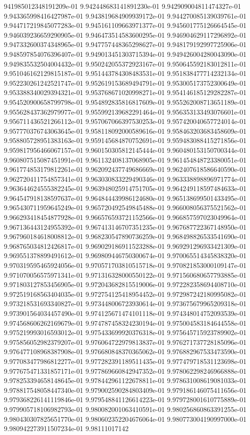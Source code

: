 941985012348191209e-01	9.942448683141891230e-01	9.942909004811474327e-01	9.943365998416427987e-01	9.943819684909939172e-01	9.944270085139039761e-01	9.944717219845077283e-01	9.945161109663971377e-01	9.945601775126664545e-01	9.946039236659290905e-01	9.946473514583600295e-01	9.946904629117296892e-01	9.947332600374348965e-01	9.947757448365298627e-01	9.948179192997725906e-01	9.948597854076396407e-01	9.949013451303715394e-01	9.949426004280043090e-01	9.949835532504004432e-01	9.950242055372923167e-01	9.950645592183012811e-01	9.951046162129815187e-01	9.951443784308483531e-01	9.951838477714232134e-01	9.952230261242521747e-01	9.952619153689494791e-01	9.953005173752300649e-01	9.953388340029394321e-01	9.953768671020998271e-01	9.954146185129282287e-01	9.954520900658799798e-01	9.954892835816817609e-01	9.955262008713651189e-01	9.955628437362979977e-01	9.955992139682291464e-01	9.956353133493076601e-01	9.956711436521266112e-01	9.957067066397530253e-01	9.957420040657724014e-01	9.957770376743063645e-01	9.958118092000589616e-01	9.958463203683458609e-01	9.958805728951383163e-01	9.959145684870752691e-01	9.959483088415271856e-01	9.959817956466067157e-01	9.960150305812145444e-01	9.960480153150700344e-01	9.960807515087451991e-01	9.961132408137068905e-01	9.961454848723380051e-01	9.961774853179812261e-01	9.962092437749686669e-01	9.962407618586640590e-01	9.962720411754857341e-01	9.963030833229490346e-01	9.963338898896971774e-01	9.963644624555382245e-01	9.963948025914751705e-01	9.964249118597484633e-01	9.964547918138597637e-01	9.964844439986124680e-01	9.965138699501433495e-01	9.965430711959645249e-01	9.965720492549845488e-01	9.966008056375521562e-01	9.966293418454877928e-01	9.966576593721152566e-01	9.966857597023049964e-01	9.967136443124955392e-01	9.967413146707351235e-01	9.967687722367148950e-01	9.967960184618008812e-01	9.968230547890736259e-01	9.968498826533541690e-01	9.968765034812426817e-01	9.969029186911523288e-01	9.969291296933421309e-01	9.969551378899491612e-01	9.969809446750300674e-01	9.970065514345838320e-01	9.970319595465924056e-01	9.970571703810515718e-01	9.970821853000109147e-01	9.971070056575971341e-01	9.971316328000550122e-01	9.971560680657793885e-01	9.971803127853456905e-01	9.972043682815519006e-01	9.972282358694408710e-01	9.972519168563404035e-01	9.972754125418954452e-01	9.972987242180995082e-01	9.973218531693340827e-01	9.973448006723930614e-01	9.973675679965209318e-01	9.973901564034457490e-01	9.974125671474101118e-01	9.974348014752093539e-01	9.974568606262169679e-01	9.974787458324230194e-01	9.975004583184644558e-01	9.975219993016593012e-01	9.975433699920376318e-01	9.975645715923789902e-01	9.975856052982379207e-01	9.976064722979813837e-01	9.976271737728185096e-01	9.976477108968387908e-01	9.976680848370365062e-01	9.976882967533473590e-01	9.977083477986812277e-01	9.977282391189511435e-01	9.977479718531123698e-01	9.977675471331857171e-01	9.977869660842947352e-01	9.978062298246966888e-01	9.978253394658148645e-01	9.978442961122678811e-01	9.978631008619081033e-01	9.978817548058447340e-01	9.979002590284803409e-01	9.979186146075411656e-01	9.979368226141119846e-01	9.979548841126614223e-01	9.979728001610775889e-01	9.979905718106982793e-01	9.980082001063410591e-01	9.980256860863391255e-01	9.980430307825651770e-01	9.980602352204676064e-01	9.980773004190997000e-01	9.980942273911507234e-01	9.98111017142